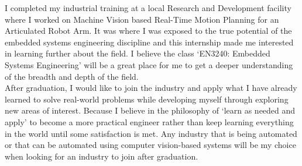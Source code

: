 \documentclass[11pt,letterpaper]{article}
\begin{document}
I completed my industrial training at a local Research and Development facility where I worked on Machine Vision based Real-Time Motion Planning for an Articulated Robot Arm. It was where I was exposed to the true potential of the embedded systems engineering discipline and this internship made me interested in learning further about the field. I believe the class `EN3240: Embedded Systems Engineering' will be a great place for me to get a deeper understanding of the breadth and depth of the field.\\


After graduation, I would like to join the industry and apply what I have already learned to solve real-world problems while developing myself through exploring new areas of interest. Because I believe in the philosophy of `learn as needed and apply’  to become a more practical engineer rather than keep learning everything in the world until some satisfaction is met. Any industry that is being automated or that can be automated using computer vision-based systems will be my choice when looking for an industry to join after graduation.
\end{document}
